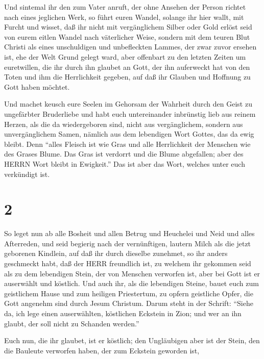  Und sintemal ihr den zum Vater anruft, der ohne Ansehen
der Person richtet nach eines jeglichen Werk, so führt euren Wandel,
solange ihr hier wallt, mit Furcht  und wisset, daß ihr
nicht mit vergänglichem Silber oder Gold erlöst seid von eurem eitlen
Wandel nach väterlicher Weise,  sondern mit dem teuren Blut
Christi als eines unschuldigen und unbefleckten Lammes, 
der zwar zuvor ersehen ist, ehe der Welt Grund gelegt ward, aber
offenbart zu den letzten Zeiten um euretwillen,  die ihr
durch ihn glaubet an Gott, der ihn auferweckt hat von den Toten und ihm
die Herrlichkeit gegeben, auf daß ihr Glauben und Hoffnung zu Gott haben
möchtet.

 Und machet keusch eure Seelen im Gehorsam der Wahrheit
durch den Geist zu ungefärbter Bruderliebe und habt euch untereinander
inbrünstig lieb aus reinem Herzen,  als die da
wiedergeboren sind, nicht aus vergänglichem, sondern aus unvergänglichem
Samen, nämlich aus dem lebendigen Wort Gottes, das da ewig bleibt.
 Denn ``alles Fleisch ist wie Gras und alle Herrlichkeit
der Menschen wie des Grases Blume. Das Gras ist verdorrt und die Blume
abgefallen;  aber des HERRN Wort bleibt in Ewigkeit.'' Das
ist aber das Wort, welches unter euch verkündigt ist.

\hypertarget{section-1}{%
\section{2}\label{section-1}}

 So leget nun ab alle Bosheit und allen Betrug und Heuchelei
und Neid und alles Afterreden,  und seid begierig nach der
vernünftigen, lautern Milch als die jetzt geborenen Kindlein, auf daß
ihr durch dieselbe zunehmet,  so ihr anders geschmeckt habt,
daß der HERR freundlich ist,  zu welchem ihr gekommen seid
als zu dem lebendigen Stein, der von Menschen verworfen ist, aber bei
Gott ist er auserwählt und köstlich.  Und auch ihr, als die
lebendigen Steine, bauet euch zum geistlichem Hause und zum heiligen
Priestertum, zu opfern geistliche Opfer, die Gott angenehm sind durch
Jesum Christum.  Darum steht in der Schrift: ``Siehe da, ich
lege einen auserwählten, köstlichen Eckstein in Zion; und wer an ihn
glaubt, der soll nicht zu Schanden werden.''

 Euch nun, die ihr glaubet, ist er köstlich; den Ungläubigen
aber ist der Stein, den die Bauleute verworfen haben, der zum Eckstein
geworden ist,

